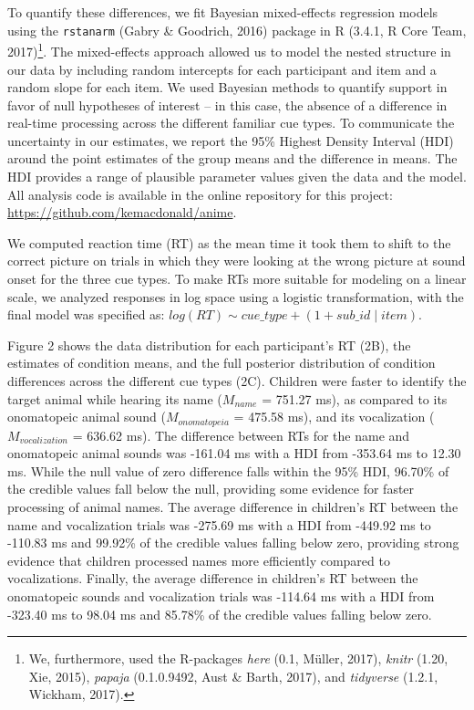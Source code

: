 \documentclass[english,floatsintext,man]{apa6}
\theoremstyle{definition}
\theoremstyle{definition}
\theoremstyle{definition}
\theoremstyle{remark}
\begin{document}
To quantify these differences, we fit Bayesian mixed-effects regression
models using the \texttt{rstanarm} (Gabry \& Goodrich, 2016) package in
R (3.4.1, R Core Team, 2017)\footnote{We, furthermore, used the
  R-packages \emph{here} (0.1, Müller, 2017), \emph{knitr} (1.20, Xie,
  2015), \emph{papaja} (0.1.0.9492, Aust \& Barth, 2017), and
  \emph{tidyverse} (1.2.1, Wickham, 2017).}. The mixed-effects approach
allowed us to model the nested structure in our data by including random
intercepts for each participant and item and a random slope for each
item. We used Bayesian methods to quantify support in favor of null
hypotheses of interest -- in this case, the absence of a difference in
real-time processing across the different familiar cue types. To
communicate the uncertainty in our estimates, we report the 95\% Highest
Density Interval (HDI) around the point estimates of the group means and
the difference in means. The HDI provides a range of plausible parameter
values given the data and the model. All analysis code is available in
the online repository for this project:
\url{https://github.com/kemacdonald/anime}.

We computed reaction time (RT) as the mean time it took them to shift to
the correct picture on trials in which they were looking at the wrong
picture at sound onset for the three cue types. To make RTs more
suitable for modeling on a linear scale, we analyzed responses in log
space using a logistic transformation, with the final model was
specified as: \(log(RT) \sim cue\_type + (1 + sub\_id \mid item)\).

Figure 2 shows the data distribution for each participant's RT (2B), the
estimates of condition means, and the full posterior distribution of
condition differences across the different cue types (2C). Children were
faster to identify the target animal while hearing its name
(\(M_{name}\) = 751.27 ms), as compared to its onomatopeic animal sound
(\(M_{onomatopeia}\) = 475.58 ms), and its vocalization
(\(M_{vocalization}\) = 636.62 ms). The difference between RTs for the
name and onomatopeic animal sounds was -161.04 ms with a HDI from
-353.64 ms to 12.30 ms. While the null value of zero difference falls
within the 95\% HDI, 96.70\% of the credible values fall below the null,
providing some evidence for faster processing of animal names. The
average difference in children's RT between the name and vocalization
trials was -275.69 ms with a HDI from -449.92 ms to -110.83 ms and
99.92\% of the credible values falling below zero, providing strong
evidence that children processed names more efficiently compared to
vocalizations. Finally, the average difference in children's RT between
the onomatopeic sounds and vocalization trials was -114.64 ms with a HDI
from -323.40 ms to 98.04 ms and 85.78\% of the credible values falling
below zero.
\end{document}
